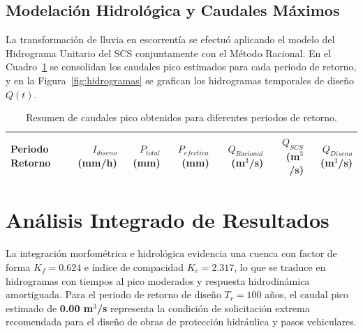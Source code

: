 \documentclass[11pt,a4paper]{article}
\begin{document}
\subsection{Modelación Hidrológica y Caudales Máximos}
La transformación de lluvia en escorrentía se efectuó aplicando el modelo del Hidrograma Unitario del SCS conjuntamente con el Método Racional. En el Cuadro~\ref{tab:caudales} se consolidan los caudales pico estimados para cada periodo de retorno, y en la Figura~\ref{fig:hidrogramas} se grafican los hidrogramas temporales de diseño $Q(t)$.

\begin{table}[H]
\centering
\caption{Resumen de caudales pico obtenidos para diferentes periodos de retorno.}
\label{tab:caudales}
\begin{tabular}{lrrrrrr}\toprule
\textbf{Periodo Retorno} & \textbf{$I_{diseno}$ (mm/h)} & \textbf{$P_{total}$ (mm)} & \textbf{$P_{efectiva}$ (mm)} & \textbf{$Q_{Racional}$ (m$^3$/s)} & \textbf{$Q_{SCS}$ (m$^3$/s)} & \textbf{$Q_{Diseno}$ (m$^3$/s)} \\\midrule

\bottomrule
\end{tabular}
\end{table}



\section{Análisis Integrado de Resultados}
La integración morfométrica e hidrológica evidencia una cuenca con factor de forma $K_f = 0.624$ e índice de compacidad $K_c = 2.317$, lo que se traduce en hidrogramas con tiempos al pico moderados y respuesta hidrodinámica amortiguada. Para el periodo de retorno de diseño $T_r = 100$ años, el caudal pico estimado de \textbf{0.00 m$^3$/s} representa la condición de solicitación extrema recomendada para el diseño de obras de protección hidráulica y pasos vehiculares.

\end{document}
